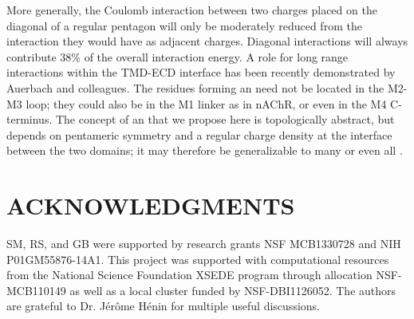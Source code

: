 \documentclass[9pt,twocolumn,twoside,lineno]{pnas-new}
\begin{document}
More generally, the Coulomb interaction between two charges placed on the diagonal of a regular pentagon will only be moderately reduced from the interaction they would have as adjacent charges. Diagonal interactions will always contribute $38\%$ of the overall interaction energy.  A role for long range interactions within the \nachr TMD-ECD interface has been recently demonstrated by Auerbach and colleagues\cite{Gupta2017}.  The residues forming an \fivering  need not be located in the M2-M3 loop; they could also be in the M1 linker as in nAChR, or even in the M4 C-terminus.  The concept of an \fivering that we propose here is topologically abstract, but depends on pentameric symmetry and a regular charge density at the interface between the two domains; it may therefore be generalizable to many or even all \plgics.    %


\section*{ACKNOWLEDGMENTS}
SM, RS, and GB were supported by research grants  NSF MCB1330728 and NIH P01GM55876-14A1. This project was supported with computational resources from the National Science Foundation XSEDE program through allocation NSF-MCB110149 as well as a local cluster funded by NSF-DBI1126052.  The authors are grateful to Dr. J\'{e}r\^{o}me H\'{e}nin for multiple useful discussions.  



\end{document}
